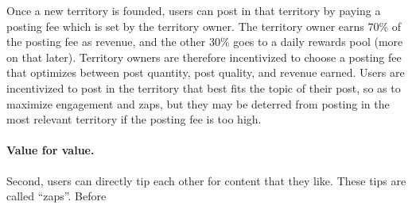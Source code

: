Once a new territory is founded, users can post in that territory by paying a posting fee which is set by the territory owner. The territory owner earns 70\% of the posting fee as revenue, and the other 30\% goes to a daily rewards pool (more on that later). Territory owners are therefore incentivized to choose a posting fee that optimizes between post quantity, post quality, and revenue earned. Users are incentivized to post in the territory that best fits the topic of their post, so as to maximize engagement and zaps, but they may be deterred from posting in the most relevant territory if the posting fee is too high. 

\paragraph{Value for value.} Second, users can directly tip each other for content that they like. These tips are called ``zaps''. Before 
